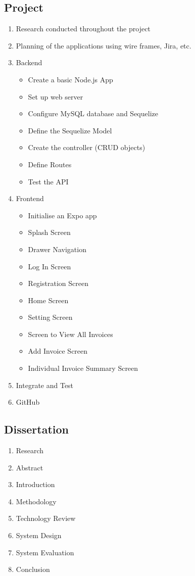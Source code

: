 \subsection{Project} 
\begin{enumerate}
    \item Research conducted throughout the project
    \item Planning of the applications using wire frames, Jira, etc.
    \item Backend
        \begin{itemize}
            \item Create a basic Node.js App
            \item Set up web server
            \item Configure MySQL database and Sequelize
            \item Define the Sequelize Model
            \item Create the controller (CRUD objects)
            \item Define Routes
            \item Test the API
        \end{itemize}
    \item Frontend
        \begin{itemize}
            \item Initialise an Expo app
            \item Splash Screen
            \item Drawer Navigation
            \item Log In Screen
            \item Registration Screen
            \item Home Screen
            \item Setting Screen
            \item Screen to View All Invoices
            \item Add Invoice Screen
            \item Individual Invoice Summary Screen
        \end{itemize}
    \item Integrate and Test
    \item GitHub
\end{enumerate}
\subsection{Dissertation}
\begin{enumerate}
    \item Research
    \item Abstract
    \item Introduction
    \item Methodology
    \item Technology Review
    \item System Design
    \item System Evaluation
    \item Conclusion
\end{enumerate}

